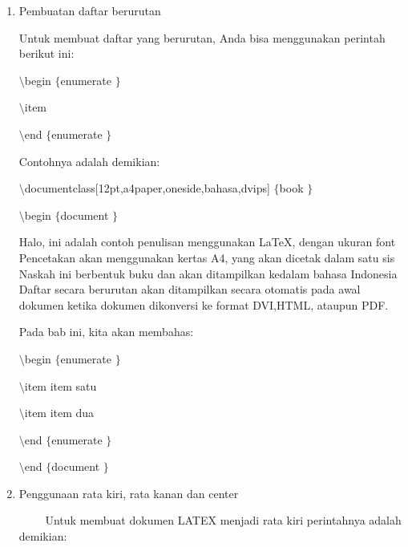\begin{enumerate}
\item  Pembuatan daftar berurutan \par
Untuk membuat daftar yang berurutan, Anda bisa menggunakan perintah berikut ini: \par
{\fontsize{10pt}{10pt}\selectfont  $  \setminus  $begin $  \{  $enumerate $  \}  $} \par
{\fontsize{10pt}{10pt}\selectfont  $  \setminus  $item} \par
{\fontsize{10pt}{10pt}\selectfont  $  \setminus  $end $  \{  $enumerate $  \}  $} \par
\vspace{12pt}
Contohnya adalah demikian: \par
{\fontsize{10pt}{10pt}\selectfont  $  \setminus  $documentclass[12pt,a4paper,oneside,bahasa,dvips] $  \{  $book $  \}  $} \par
{\fontsize{10pt}{10pt}\selectfont  $  \setminus  $begin $  \{  $document $  \}  $} \par
\vspace{10pt}
{\fontsize{10pt}{10pt}\selectfont Halo, ini adalah contoh penulisan menggunakan LaTeX, dengan ukuran font Pencetakan akan menggunakan kertas A4, yang akan dicetak dalam satu sis Naskah ini berbentuk buku dan akan ditampilkan kedalam bahasa Indonesia Daftar secara berurutan akan ditampilkan secara otomatis pada awal {\fontsize{9pt}{9pt}\selectfont dokumen ketika dokumen dikonversi ke format DVI,HTML, ataupun PDF.}} \par
\vspace{12pt}
{\fontsize{10pt}{10pt}\selectfont Pada bab ini, kita akan membahas:} \par
{\fontsize{10pt}{10pt}\selectfont  $  \setminus  $begin $  \{  $enumerate $  \}  $} \par
{\fontsize{10pt}{10pt}\selectfont  $  \setminus  $item item satu} \par
{\fontsize{10pt}{10pt}\selectfont  $  \setminus  $item item dua} \par
{\fontsize{10pt}{10pt}\selectfont  $  \setminus  $end $  \{  $enumerate $  \}  $} \par
{\fontsize{10pt}{10pt}\selectfont  $  \setminus  $end $  \{  $document $  \}  $} \par
\vspace{10pt}
\noindent 
\item Penggunaan rata kiri, rata kanan dan center \par
\noindent 
~~~~ Untuk membuat dokumen LATEX menjadi rata kiri perintahnya adalah demikian: \par

\end{enumerate}
